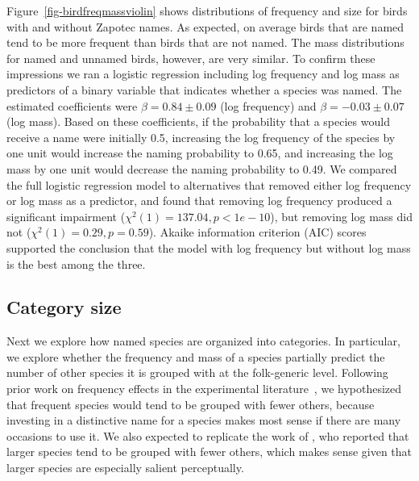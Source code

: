 \documentclass[10pt,letterpaper]{article}
\begin{document}
Figure~\ref{fig-birdfreqmassviolin} shows distributions of frequency and size for birds with and without Zapotec names.  As expected, on average birds that are named tend to be more frequent than birds that are not named. The mass distributions for named and unnamed birds, however, are very similar. To confirm these impressions we ran a logistic regression including log frequency and log mass as predictors of a binary variable that indicates whether a species was named. The estimated coefficients were $\beta = 0.84 \pm 0.09$ (log frequency) and $\beta = -0.03 \pm 0.07$ (log mass). Based on these coefficients, if the probability that a species would receive a name were initially 0.5, increasing the log frequency of the species by one unit would increase the naming probability to 0.65, and increasing the log mass by one unit would decrease the naming probability to 0.49. We compared the full logistic regression model to alternatives that removed either log frequency or log mass as a predictor, and found that removing log frequency produced a significant impairment ($\chi^{2}(1) = 137.04, p < 1e-10$), but removing log mass did not ($\chi^{2}(1) = 0.29, p = 0.59$).  Akaike information criterion (AIC) scores supported the conclusion that the model with log frequency but without log mass is the best among the three. 




\subsection{Category size}


Next we explore how named species are organized into categories. In particular, we explore whether the frequency and mass of a species partially predict the number of other species it is grouped with at the folk-generic level.  Following prior work on frequency effects in the experimental literature~\cite{parducci83}, we hypothesized that frequent species would tend to be grouped with fewer others, because investing in a distinctive name for a species makes most sense if there are many occasions to use it. We also expected to replicate the work of , who reported that larger species tend to be grouped with fewer others, which makes sense given that larger species are especially salient perceptually. 
\end{document}

